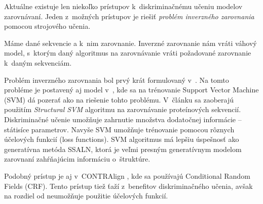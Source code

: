Aktuálne existuje len niekoľko prístupov k~diskriminačnému učeniu modelov zarovnávaní.
Jeden z~možných prístupov je riešiť \textit{problém inverzného zarovnania} pomocou strojového učenia. \cite{svmTrainingProteinsAlignment}

\begin{df}
Máme dané sekvencie a k~nim zarovnanie. Inverzné zarovnanie nám vráti váhový model, s~ktorým daný algoritmus na zarovnávanie vráti požadované zarovnanie k~daným sekvenciám.
\end{df}

Problém inverzného zarovnania bol prvý krát formulovaný v~\cite{inverseAlign1}.
Na tomto probléme je postavený aj model v~\cite{svmTrainingProteinsAlignment}, kde sa na trénovanie Support Vector Machine (SVM) dá pozerať ako na riešenie tohto problému. V~článku sa zaoberajú použitím \textit{Structural SVM} algoritmu na zarovnávanie proteínových sekvencií. Diskriminačné učenie umožňuje zahrnutie množstva dodatočnej informácie -- státisíce parametrov.
Navyše SVM umožňuje trénovanie pomocou rôznych účelových funkcií (loss functions).
SVM algoritmus má lepšiu úspešnosť ako generatívna metóda SSALN, ktorá je veľmi presným generatívnym modelom zarovnaní zahŕňajúcim informáciu o~štruktúre.

Podobný prístup je aj v~CONTRAlign \cite{contralign}, kde sa používajú Conditional Random Fields (CRF). Tento prístup tiež ťaží z~benefitov diskriminačného učenia, avšak na rozdiel od \cite{svmTrainingProteinsAlignment} neumožňuje použitie účelových funkcií.
